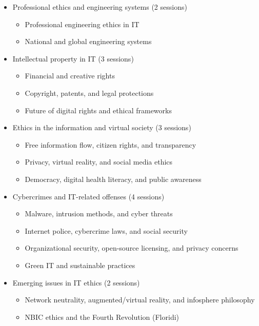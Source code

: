 \documentclass[12pt]{article}
\begin{document}
\begin{itemize}
    \item Professional ethics and engineering systems (2 sessions)
    \begin{itemize}
        \item Professional engineering ethics in IT
        \item National and global engineering systems
    \end{itemize}

    \item Intellectual property in IT (3 sessions)
    \begin{itemize}
        \item Financial and creative rights
        \item Copyright, patents, and legal protections
        \item Future of digital rights and ethical frameworks
    \end{itemize}

    \item Ethics in the information and virtual society (3 sessions)
    \begin{itemize}
        \item Free information flow, citizen rights, and transparency
        \item Privacy, virtual reality, and social media ethics
        \item Democracy, digital health literacy, and public awareness
    \end{itemize}

    \item Cybercrimes and IT-related offenses (4 sessions)
    \begin{itemize}
        \item Malware, intrusion methods, and cyber threats
        \item Internet police, cybercrime laws, and social security
        \item Organizational security, open-source licensing, and privacy concerns
        \item Green IT and sustainable practices
    \end{itemize}

    \item Emerging issues in IT ethics (2 sessions)
    \begin{itemize}
        \item Network neutrality, augmented/virtual reality, and infosphere philosophy
        \item NBIC ethics and the Fourth Revolution (Floridi)
    \end{itemize}
\end{itemize}
\end{document}
